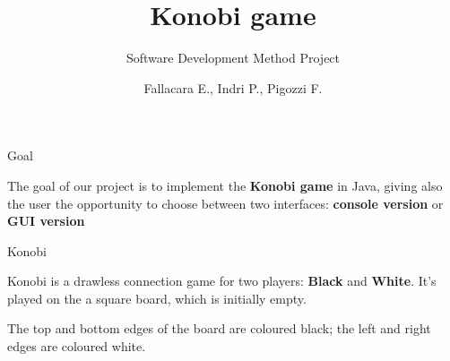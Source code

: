 \documentclass{beamer}
\title{Konobi game}
\subtitle{Software Development Method Project}
\author{Fallacara E., Indri P., Pigozzi F.}
\date{}
\begin{document}
	\setcounter{showSlideNumbers}{0}

	\frame{\titlepage}

	\setcounter{framenumber}{0}
	\setcounter{showSlideNumbers}{1}



  \begin{frame}{Goal}

    \begin{tcolorbox}[colback=red!90!black!10]
      \begin{center}
        The goal of our project is to implement the \textbf{Konobi game} in Java, giving also the user the opportunity to choose between two interfaces: \textbf{console version} or \textbf{GUI version}
      \end{center}
    \end{tcolorbox}

  \end{frame}



  \begin{frame}{Konobi}

    Konobi is a drawless connection game for two players: \textbf{Black}
    and \textbf{White}. It's played on the a square board, which is initially empty. 

    \vspace{1em}

    The top and bottom edges of the board are coloured black; the left and right edges are coloured white.

    \vspace{1em}

    \begin{centering}


    \end{centering}

  \end{frame}
\end{document}
